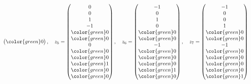 \begin{loesung}
\[\begin{pmatrix}
\color{green} 0
\end{pmatrix}
,\quad
z_5=
\begin{pmatrix}
              0\\
              0\\
              1\\
             -1\\
\color{green} 0\\
\color{green} 0\\
              0\\
\color{green} 0\\
\color{green} 0\\
\color{green} 1\\
\color{green} 0\\
\color{green} 0
\end{pmatrix}
,\quad
z_6=\begin{pmatrix}
             -1\\
              0\\
              1\\
              0\\
\color{green} 0\\
\color{green} 0\\
             -1\\
\color{green} 0\\
\color{green} 0\\
\color{green} 0\\
\color{green} 1\\
\color{green} 0
\end{pmatrix}
,\quad
z_7=\begin{pmatrix}
             -1\\
              0\\
              0\\
              1\\
\color{green} 0\\
\color{green} 0\\
             -1\\
\color{green} 0\\
\color{green} 0\\
\color{green} 0\\
\color{green} 0\\
\color{green} 1
\end{pmatrix}
\]

\end{loesung}
